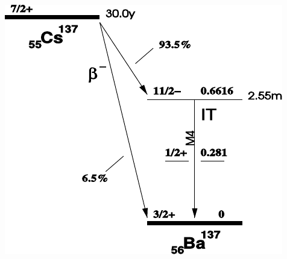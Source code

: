 \begin{center}
    \begin{adjustbox}{max width=\linewidth, keepaspectratio}
        \includegraphics[]{pdf/137Cs}
    \end{adjustbox}
    \label{fig:137CsDecayScheme}
\end{center}
%
